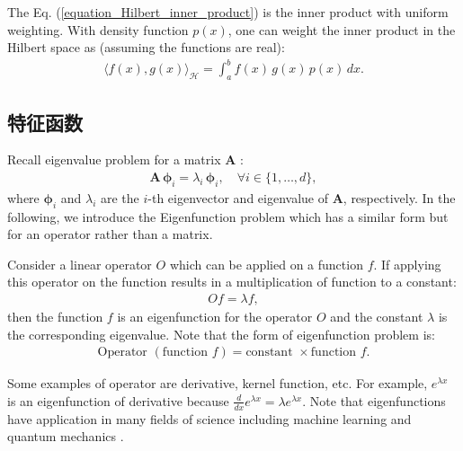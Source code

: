 \documentclass[lang=cn,10pt]{gorgeousnbook}
\numberwithin{equation}{section}%
\numberwithin{figure}{section}%
\begin{document}
\begin{corollary}
The Eq. (\ref{equation_Hilbert_inner_product}) is the inner product with uniform weighting. With density function $p(x)$, one can weight the inner product in the Hilbert space as (assuming the functions are real):
\begin{align}\label{equation_Hilbert_inner_product_weighted}
\langle f(x), g(x)  \rangle_\mathcal{H} = \int_a^b f(x)\, g(x)\, p(x)\, dx.
\end{align}
\end{corollary}

\subsection{特征函数}

Recall eigenvalue problem for a matrix $\boldsymbol{A}$ \cite{ghojogh2019eigenvalue}:
\begin{align}
\boldsymbol{A}\, \boldsymbol{\phi}_i = \lambda_i\, \boldsymbol{\phi}_i, \quad \forall i \in \{1, \dots, d\},
\end{align}
where $\boldsymbol{\phi}_i$ and $\lambda_i$ are the $i$-th eigenvector and eigenvalue of $\boldsymbol{A}$, respectively. 
In the following, we introduce the Eigenfunction problem which has a similar form but for an operator rather than a matrix. 

\begin{definition}[Eigenfunction]\label{definition_eigenfunction}
Consider a linear operator $O$ which can be applied on a function $f$. If applying this operator on the function results in a multiplication of function to a constant:
\begin{align}\label{equation_eigenfunction}
O f = \lambda f,
\end{align}
then the function $f$ is an eigenfunction for the operator $O$ and the constant $\lambda$ is the corresponding eigenvalue.
Note that the form of eigenfunction problem is:
\begin{align}
\text{Operator }( \text{function }f ) = \text{constant } \times \text{function }f.
\end{align}
\end{definition}
Some examples of operator are derivative, kernel function, etc. For example, $e^{\lambda x}$ is an eigenfunction of derivative because $\frac{d}{dx} e^{\lambda x} = \lambda e^{\lambda x}$.
Note that eigenfunctions have application in many fields of science including machine learning \cite{bengio2003spectral} and quantum mechanics \cite{reed1972methods}.
\end{document}
